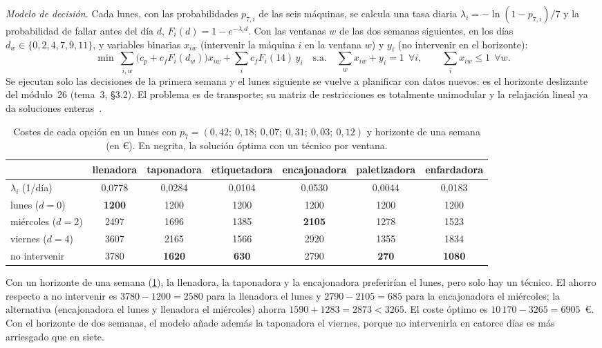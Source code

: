 \begin{ejemplo}
\emph{Modelo de decisión.} Cada lunes, con las probabilidades $p_{7,i}$ de las seis máquinas, se calcula una tasa diaria $\lambda_i=-\ln(1-p_{7,i})/7$ y la probabilidad de fallar antes del día $d$, $F_i(d)=1-e^{-\lambda_id}$. Con las ventanas $w$ de las dos semanas siguientes, en los días $d_w\in\{0,2,4,7,9,11\}$, y variables binarias $x_{iw}$ (intervenir la máquina $i$ en la ventana $w$) y $y_i$ (no intervenir en el horizonte):
\[
\min\ \sum_{i,w}\bigl(c_p+c_fF_i(d_w)\bigr)x_{iw}+\sum_i c_fF_i(14)\,y_i\quad\text{s.a.}\quad\sum_w x_{iw}+y_i=1\ \ \forall i,\qquad\sum_i x_{iw}\le1\ \ \forall w .
\]
Se ejecutan solo las decisiones de la primera semana y el lunes siguiente se vuelve a planificar con datos nuevos: es el horizonte deslizante del módulo~26 (tema~3, §3.2). El problema es de transporte; su matriz de restricciones es totalmente unimodular y la relajación lineal ya da soluciones enteras~\cite[cap.~7]{bt}.
\end{ejemplo}

\begin{table}[h]
\centering\small
\caption{Costes de cada opción en un lunes con $p_7=(0{,}42;\ 0{,}18;\ 0{,}07;\ 0{,}31;\ 0{,}03;\ 0{,}12)$ y horizonte de una semana (en €). En negrita, la solución óptima con un técnico por ventana.}\label{tab:plan}
\setlength{\tabcolsep}{4pt}\footnotesize
\begin{tabular}{@{}lcccccc@{}}
\toprule
 & llenadora & taponadora & etiquetadora & encajonadora & paletizadora & enfardadora \\
\midrule
$\lambda_i$ (1/día) & 0{,}0778 & 0{,}0284 & 0{,}0104 & 0{,}0530 & 0{,}0044 & 0{,}0183 \\
lunes ($d=0$) & \textbf{1200} & 1200 & 1200 & 1200 & 1200 & 1200 \\
miércoles ($d=2$) & 2497 & 1696 & 1385 & \textbf{2105} & 1278 & 1523 \\
viernes ($d=4$) & 3607 & 2165 & 1566 & 2920 & 1355 & 1834 \\
no intervenir & 3780 & \textbf{1620} & \textbf{630} & 2790 & \textbf{270} & \textbf{1080} \\
\bottomrule
\end{tabular}
\end{table}

Con un horizonte de una semana (\cref{tab:plan}), la llenadora, la taponadora y la encajonadora preferirían el lunes, pero solo hay un técnico. El ahorro respecto a no intervenir es $3780-1200=2580$ para la llenadora el lunes y $2790-2105=685$ para la encajonadora el miércoles; la alternativa (encajonadora el lunes y llenadora el miércoles) ahorra $1590+1283=2873<3265$. El coste óptimo es $10\,170-3265=6905$~€. Con el horizonte de dos semanas, el modelo añade además la taponadora el viernes, porque no intervenirla en catorce días es más arriesgado que en siete.

